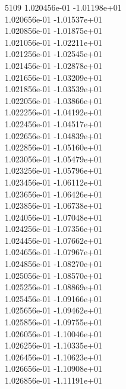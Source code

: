 5109	1.020456e-01	-1.01198e+01	\\ 	1.020656e-01	-1.01537e+01	\\ 	1.020856e-01	-1.01875e+01	\\ 	1.021056e-01	-1.02211e+01	\\ 	1.021256e-01	-1.02545e+01	\\ 	1.021456e-01	-1.02878e+01	\\ 	1.021656e-01	-1.03209e+01	\\ 	1.021856e-01	-1.03539e+01	\\ 	1.022056e-01	-1.03866e+01	\\ 	1.022256e-01	-1.04192e+01	\\ 	1.022456e-01	-1.04517e+01	\\ 	1.022656e-01	-1.04839e+01	\\ 	1.022856e-01	-1.05160e+01	\\ 	1.023056e-01	-1.05479e+01	\\ 	1.023256e-01	-1.05796e+01	\\ 	1.023456e-01	-1.06112e+01	\\ 	1.023656e-01	-1.06426e+01	\\ 	1.023856e-01	-1.06738e+01	\\ 	1.024056e-01	-1.07048e+01	\\ 	1.024256e-01	-1.07356e+01	\\ 	1.024456e-01	-1.07662e+01	\\ 	1.024656e-01	-1.07967e+01	\\ 	1.024856e-01	-1.08270e+01	\\ 	1.025056e-01	-1.08570e+01	\\ 	1.025256e-01	-1.08869e+01	\\ 	1.025456e-01	-1.09166e+01	\\ 	1.025656e-01	-1.09462e+01	\\ 	1.025856e-01	-1.09755e+01	\\ 	1.026056e-01	-1.10046e+01	\\ 	1.026256e-01	-1.10335e+01	\\ 	1.026456e-01	-1.10623e+01	\\ 	1.026656e-01	-1.10908e+01	\\ 	1.026856e-01	-1.11191e+01	\\ \hline
